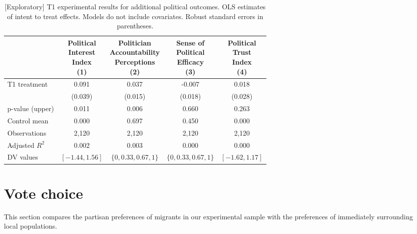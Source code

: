 \documentclass[
  11.5pt,
]{article}
\begin{document}
\begin{table}[!h]

\caption{\label{tab:unnamed-chunk-61}[Exploratory] T1 experimental results for additional political outcomes. OLS estimates of intent to treat effects. Models do not include covariates. Robust standard errors in parentheses.}
\centering
\begin{tabular}[t]{lcccc}
\toprule
 & \makecell[c]{Political\\ Interest\\ Index \\(1)} & \makecell[c]{Politician\\ Accountability\\ Perceptions \\(2)} & \makecell[c]{Sense of\\ Political\\ Efficacy \\(3)} & \makecell[c]{Political\\ Trust\\ Index \\(4)}\\
\midrule
T1 treatment & 0.091 & 0.037 & -0.007 & 0.018\\
 & (0.039) & (0.015) & (0.018) & (0.028)\\
\midrule
p-value (upper) & 0.011 & 0.006 & 0.660 & 0.263\\
Control mean & 0.000 & 0.697 & 0.450 & 0.000\\
Observations & 2,120 & 2,120 & 2,120 & 2,120\\
Adjusted $R^2$ & 0.002 & 0.003 & 0.000 & 0.000\\
DV values & $[-1.44, 1.56]$ & $\{0, 0.33, 0.67, 1\}$ & $\{0, 0.33, 0.67, 1\}$ & $[-1.62, 1.17]$\\
\bottomrule
\end{tabular}
\end{table}

\clearpage

\hypertarget{vote-choice}{%
\section{Vote choice}\label{vote-choice}}

This section compares the partisan preferences of migrants in our
experimental sample with the preferences of immediately surrounding
local populations.
\end{document}
